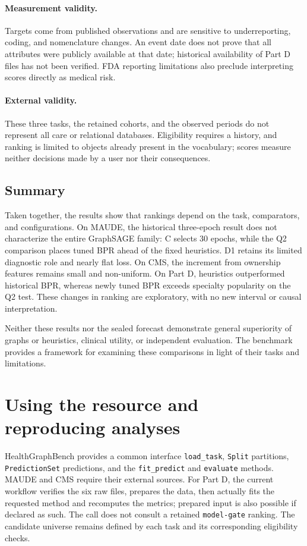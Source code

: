 \paragraph{Measurement validity.} Targets come from published observations and are sensitive to underreporting, coding, and nomenclature changes. An event date does not prove that all attributes were publicly available at that date; historical availability of Part D files has not been verified\cite{hgbresults}. FDA reporting limitations also preclude interpreting scores directly as medical risk\cite{fda2026}.

\paragraph{External validity.} These three tasks, the retained cohorts, and the observed periods do not represent all care or relational databases. Eligibility requires a history, and ranking is limited to objects already present in the vocabulary; scores measure neither decisions made by a user nor their consequences.

\subsection{Summary}

Taken together, the results show that rankings depend on the task, comparators, and configurations. On MAUDE, the historical three-epoch result does not characterize the entire GraphSAGE family: C selects 30 epochs, while the Q2 comparison places tuned BPR ahead of the fixed heuristics. D1 retains its limited diagnostic role and nearly flat loss. On CMS, the increment from ownership features remains small and non-uniform. On Part D, heuristics outperformed historical BPR, whereas newly tuned BPR exceeds specialty popularity on the Q2 test. These changes in ranking are exploratory, with no new interval or causal interpretation.

Neither these results nor the sealed forecast demonstrate general superiority of graphs or heuristics, clinical utility, or independent evaluation. The benchmark provides a framework for examining these comparisons in light of their tasks and limitations.

\section{Using the resource and reproducing analyses}
\label{sec:repro}
HealthGraphBench provides a common interface \texttt{load\_task}, \texttt{Split} partitions, \texttt{PredictionSet} predictions, and the \texttt{fit\_predict} and \texttt{evaluate} methods\cite{hgbinterface}. MAUDE and CMS require their external sources. For Part D, the current workflow verifies the six raw files, prepares the data, then actually fits the requested method and recomputes the metrics; prepared input is also possible if declared as such. The call does not consult a retained \texttt{model-gate} ranking. The candidate universe remains defined by each task and its corresponding eligibility checks.

